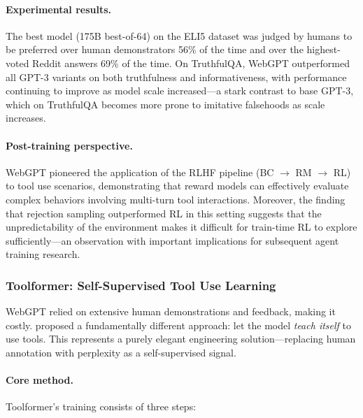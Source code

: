 \paragraph{Experimental results.} The best model (175B best-of-64) on the ELI5 dataset was judged by humans to be preferred over human demonstrators 56\% of the time and over the highest-voted Reddit answers 69\% of the time. On TruthfulQA, WebGPT outperformed all GPT-3 variants on both truthfulness and informativeness, with performance continuing to improve as model scale increased---a stark contrast to base GPT-3, which on TruthfulQA becomes more prone to imitative falsehoods as scale increases.

\paragraph{Post-training perspective.} WebGPT pioneered the application of the RLHF pipeline (BC $\rightarrow$ RM $\rightarrow$ RL) to tool use scenarios, demonstrating that reward models can effectively evaluate complex behaviors involving multi-turn tool interactions. Moreover, the finding that rejection sampling outperformed RL in this setting suggests that the unpredictability of the environment makes it difficult for train-time RL to explore sufficiently---an observation with important implications for subsequent agent training research.

\subsubsection{Toolformer: Self-Supervised Tool Use Learning}

WebGPT relied on extensive human demonstrations and feedback, making it costly.  proposed a fundamentally different approach: let the model \emph{teach itself} to use tools. This represents a purely elegant engineering solution---replacing human annotation with perplexity as a self-supervised signal.

\paragraph{Core method.} Toolformer's training consists of three steps:

